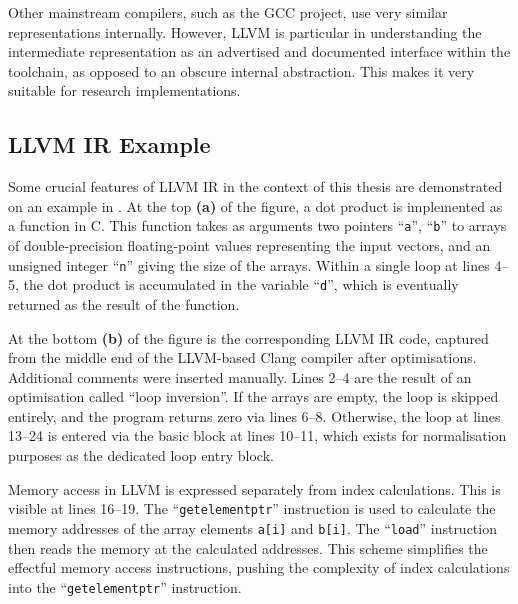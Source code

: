     Other mainstream compilers, such as the GCC project, use very similar
    representations internally.
    However, LLVM is particular in understanding the intermediate
    representation as an advertised and documented interface within the
    toolchain, as opposed to an obscure internal abstraction.
    This makes it very suitable for research implementations.

\subsection{LLVM IR Example}

    Some crucial features of LLVM IR in the context of this thesis are
    demonstrated on an example in .
    At the top {\bf (a)} of the figure, a dot product is implemented as a
    function in C.
    This function takes as arguments two pointers ``{\tt a}'', ``{\tt b}'' to
    arrays of double-precision floating-point values representing the input
    vectors, and an unsigned integer ``{\tt n}'' giving the size of the arrays.
    Within a single loop at lines 4--5, the dot product is accumulated in
    the variable ``{\tt d}'', which is eventually returned as the result of the
    function.

    At the bottom {\bf (b)} of the figure is the corresponding LLVM IR code,
    captured from the middle end of the LLVM-based Clang compiler after
    optimisations.
    Additional comments were inserted manually.
    Lines 2--4 are the result of an optimisation called ``loop inversion''.
    If the arrays are empty, the loop is skipped entirely, and the program
    returns zero via lines 6--8.
    Otherwise, the loop at lines 13--24 is entered via the basic block at lines
    10--11, which exists for normalisation purposes as the dedicated loop entry
    block.

    Memory access in LLVM is expressed separately from index calculations.
    This is visible at lines 16--19.
    The ``{\tt getelementptr}'' instruction is used to calculate the memory
    addresses of the array elements {\tt a[i]} and {\tt b[i]}.
    The ``{\tt load}'' instruction then reads the memory at the calculated
    addresses.
    This scheme simplifies the effectful memory access instructions, pushing the
    complexity of index calculations into the ``{\tt getelementptr}''
    instruction.

